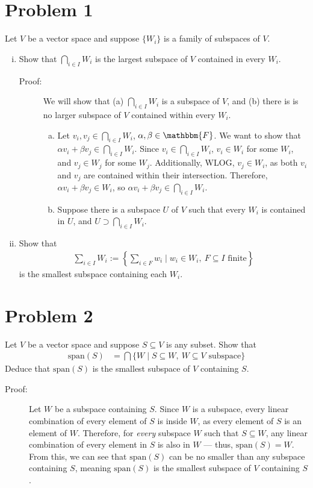 \documentclass[10pt]{extarticle}
\title{}
\author{}
\date{}
\begin{document}
  \section{Problem 1}%
  Let $V$ be a vector space and suppose $\{W_i\}$ is a family of subspaces of $V$.
  \begin{enumerate}[(i)]
    \item Show that $\bigcap_{i\in I} W_i$ is the largest subspace of $V$ contained in every $W_i$.
    \begin{description}
      \item[Proof:] We will show that (a) $\bigcap_{i\in I} W_i$ is a subspace of $V$, and (b) there is is no larger subspace of $V$ contained within every $W_i$.
        \begin{enumerate}[(a)]
          \item Let $v_i, v_j\in \bigcap_{i\in I} W_i$, $\alpha,\beta \in \mathbbm{F}$. We want to show that $\alpha v_i + \beta v_j \in \bigcap_{i\in I}W_i$. Since $v_i\in \bigcap_{i\in I}W_i$, $v_i \in W_i$ for some $W_i$, and $v_j\in W_j$ for some $W_j$. Additionally, WLOG, $v_j\in W_i$, as both $v_i$ and $v_j$ are contained within their intersection. Therefore, $\alpha v_i + \beta v_j\in W_i$, so $\alpha v_i + \beta v_j\in \bigcap_{i\in I}W_i$.
          \item Suppose there is a subspace $U$ of $V$ such that every $W_i$ is contained in $U$, and $U \supset \bigcap_{i\in I}W_i$.
        \end{enumerate}
    \end{description}
    \item Show that
      \begin{align*}
        \sum_{i\in I}W_i := \left\{\sum_{i\in F}w_i \mid w_i\in W_i,~F\subseteq I \text{ finite}\right\}
      \end{align*}
      is the smallest subspace containing each $W_i$.
  \end{enumerate}
  \section{Problem 2}%
  Let $V$ be a vector space and suppose $S\subseteq V$ is any subset. Show that
  \begin{align*}
    \text{span}(S) &= \bigcap \{W\mid S\subseteq W,~W\subseteq V \text{ subspace}\}
  \end{align*}
  Deduce that $\text{span}(S)$ is the smallest subspace of $V$ containing $S$.
  \begin{description}
    \item[Proof:] Let $W$ be a subspace containing $S$. Since $W$ is a subspace, every linear combination of every element of $S$ is inside $W$, as every element of $S$ is an element of $W$. Therefore, for \textit{every} subspace $W$ such that $S\subseteq W$, any linear combination of every element in $S$ is also in $W$ --- thus, $\text{span}(S) = W$.\\

      From this, we can see that $\text{span}(S)$ can be no smaller than any subspace containing $S$, meaning $\text{span}(S)$ is the smallest subspace of $V$ containing $S$.
  \end{description}
\end{document}
